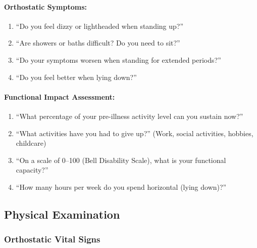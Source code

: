 \paragraph{Orthostatic Symptoms:}
\begin{enumerate}
    \item ``Do you feel dizzy or lightheaded when standing up?''
    \item ``Are showers or baths difficult? Do you need to sit?''
    \item ``Do your symptoms worsen when standing for extended periods?''
    \item ``Do you feel better when lying down?''
\end{enumerate}

\paragraph{Functional Impact Assessment:}
\begin{enumerate}
    \item ``What percentage of your pre-illness activity level can you sustain now?''
    \item ``What activities have you had to give up?'' (Work, social activities, hobbies, childcare)
    \item ``On a scale of 0--100 (Bell Disability Scale), what is your functional capacity?''
    \item ``How many hours per week do you spend horizontal (lying down)?''
\end{enumerate}

\subsection{Physical Examination}

\subsubsection{Orthostatic Vital Signs}


